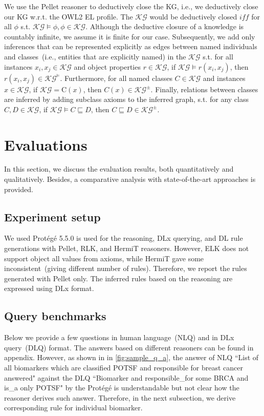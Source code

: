 \hspace*{3.5mm} We use the Pellet reasoner to deductively close the KG, i.e., we deductively close our KG w.r.t. the OWL2 EL profile. The $\mathcal{KG}$ would be deductively closed $iff$ for all $\phi$ s.t. $\mathcal{KG} \models \phi, \phi \in \mathcal{KG}$. Although the deductive closure of a knowledge is countably infinite, we assume it is finite for our case. Subsequently, we add only inferences that can be represented explicitly as edges between named individuals and classes~(i.e., entities that are explicitly named) in the $\mathcal{KG}$ s.t. for all instances $x_{i}, x_{j} \in \mathcal{KG}$ and object properties $r \in \mathcal{KG}$, if $\mathcal{KG} \models r\left(x_{i}, x_{j}\right)$, then $r\left(x_{i}, x_{j}\right) \in \mathcal{KG} ^{\models}$. Furthermore, for all named classes $C \in \mathcal{KG}$ and instances $x \in \mathcal{KG}$, if $\mathcal{KG}=\mathrm{C}(x)$, then $C(x) \in \mathcal{KG} ^{\pm}$. Finally, relations between classes are inferred by adding subclass axioms to the inferred graph, s.t. for any class $C, D \in \mathcal{KG}$, if $\mathcal{KG} \models C \sqsubseteq D$, then $C \sqsubseteq D \in \mathcal{KG}^{\pm}$. 

\section{Evaluations}\label{chapter_8:results}
In this section, we discuss the evaluation results, both quantitatively and qualitatively. Besides, a comparative analysis with state-of-the-art approaches is provided. 

\subsection{Experiment setup}
We used Prot{\'e}g{\'e} 5.5.0 is used for the reasoning, DLx querying, and DL rule generations with Pellet, RLK, and HermiT reasoners. 
However, ELK does not support object all values from axioms, while HermiT gave some inconsistent~(giving different number of rules). Therefore, we report the rules generated with Pellet only. The inferred rules based on the reasoning are expressed using DLx format. 

\subsection{Query benchmarks}
Below we provide a few questions in human language~(NLQ) and in DLx query~(DLQ) format. The answers based on different reasoners can be found in appendix. However, as shown in in \cref{fig:sample_q_a}, the answer of NLQ ``List of all biomarkers which are classified POTSF and responsible for breast cancer answered" against the DLQ ``Biomarker and responsible\_for some BRCA and is\_a only POTSF" by the Prot{\'e}g{\'e} is understandable but not clear how the reasoner derives such answer. Therefore, in the next subsection, we derive corresponding rule for individual biomarker. 

